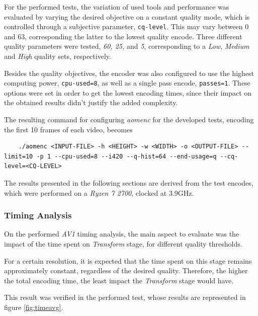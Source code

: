 For the performed tests, the variation of used tools and performance was evaluated by varying the desired objective on a constant quality mode, which is controlled through a subjective parameter, \texttt{cq-level}. This may vary between 0 and 63, corresponding the latter to the lowest quality encode. Three different quality parameters were tested, \emph{60, 25,} and \emph{5}, corresponding to a \emph{Low}, \emph{Medium} and \emph{High} quality sets, respectively.

Besides the quality objectives, the encoder was also configured to use the highest computing power, \texttt{cpu-used=8}, as well as a single pass encode, \texttt{passes=1}. These options were set in order to get the lowest encoding times, since their impact on the obtained results didn't justify the added complexity.

The resulting command for configuring \emph{aomenc} for the developed tests, encoding the first 10 frames of each video, becomes

\begin{lstlisting}
    ./aomenc <INPUT-FILE> -h <HEIGHT> -w <WIDTH> -o <OUTPUT-FILE> --limit=10 -p 1 --cpu-used=8 --i420 --q-hist=64 --end-usage=q --cq-level=<CQ-LEVEL>
\end{lstlisting}

The results presented in the following sections are derived from the test encodes, which were performed on a \emph{Ryzen 7 2700}, clocked at 3.9GHz.

\subsubsection{Timing Analysis} \label{sec:timinganal}

On the performed \emph{AV1} timing analysis, the main aspect to evaluate was the impact of the time spent on \emph{Transform} stage, for different quality thresholds.

For a certain resolution, it is expected that the time spent on this stage remains approximately constant, regardless of the desired quality. Therefore, the higher the total encoding time, the least impact the \emph{Transform} stage would have.

This result was verified in the performed test, whose results are represented in figure \ref{fig:timeavg}.


